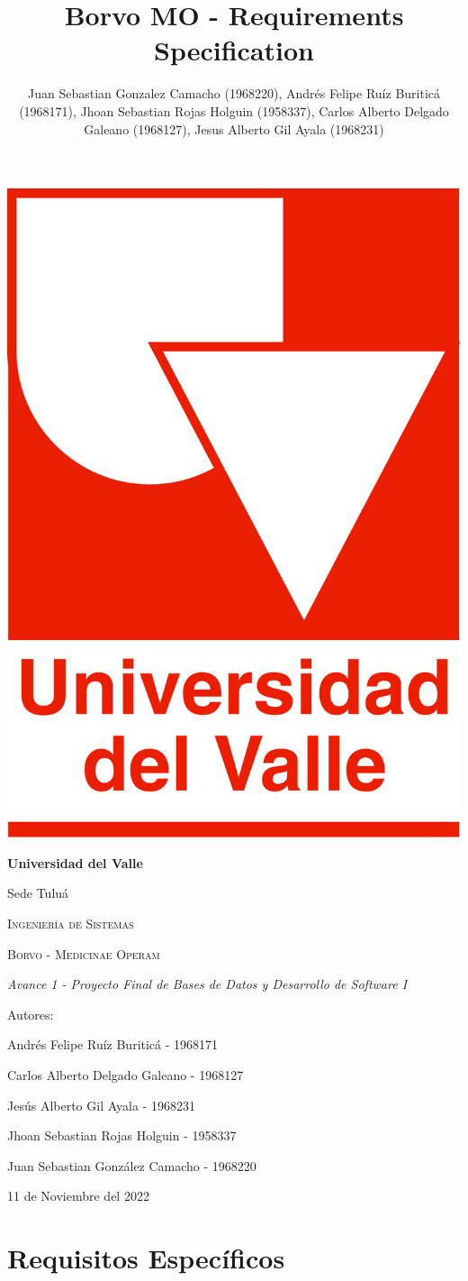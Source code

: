\documentclass[12pt,a4paper]{article}
\author{Juan Sebastian Gonzalez Camacho (1968220), Andrés Felipe Ruíz Buriticá (1968171), Jhoan Sebastian Rojas Holguin (1958337), Carlos Alberto Delgado Galeano (1968127), Jesus Alberto Gil Ayala (1968231)}
\title{Borvo MO - Requirements Specification}
\begin{document}
\begin{titlepage}
\centering
{\includegraphics[width=0.18 \textwidth]{logo.png} \par}
\vfill
{\bfseries\LARGE Universidad del Valle\par}
{\Large Sede Tuluá\par}
\vfill
{\scshape\Large Ingeniería de Sistemas \par}
\vfill
{\scshape\Huge Borvo - Medicinae Operam \par}
\vfill
{\itshape\Large Avance 1 - Proyecto Final de Bases de Datos y Desarrollo de Software I \par}
\vfill
{\Large Autores: \par}
{\Large Andrés Felipe Ruíz Buriticá - 1968171 \par}
{\Large Carlos Alberto Delgado Galeano - 1968127 \par}
{\Large Jesús Alberto Gil Ayala - 1968231 \par}
{\Large Jhoan Sebastian Rojas Holguin - 1958337 \par}
{\Large Juan Sebastian González Camacho - 1968220 \par}
\vfill
{\Large 11 de Noviembre del 2022 \par}
\end{titlepage}
\tableofcontents
\newpage
\section{Requisitos Específicos}
\end{document}
